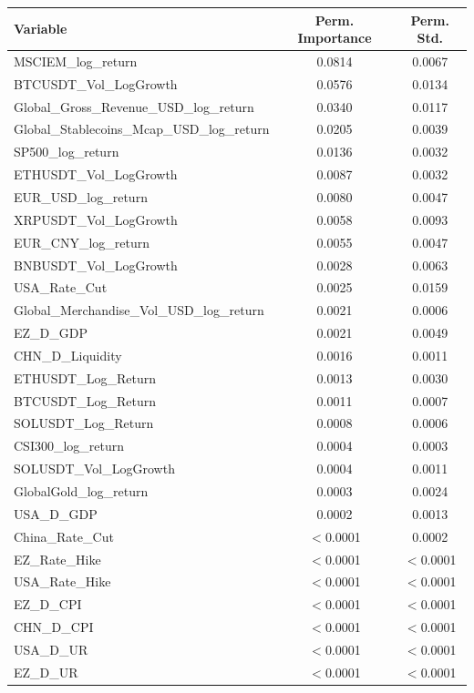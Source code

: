 \begin{tabular}{lcc}
  \toprule
  \textbf{Variable} & \textbf{Perm. Importance} & \textbf{Perm. Std.} \\ 
  \midrule
  MSCIEM\_log\_return & 0.0814 & 0.0067 \\ 
  BTCUSDT\_Vol\_LogGrowth & 0.0576 & 0.0134 \\ 
  Global\_Gross\_Revenue\_USD\_log\_return & 0.0340 & 0.0117 \\ 
  Global\_Stablecoins\_Mcap\_USD\_log\_return & 0.0205 & 0.0039 \\ 
  SP500\_log\_return & 0.0136 & 0.0032 \\ 
  ETHUSDT\_Vol\_LogGrowth & 0.0087 & 0.0032 \\ 
  EUR\_USD\_log\_return & 0.0080 & 0.0047 \\ 
  XRPUSDT\_Vol\_LogGrowth & 0.0058 & 0.0093 \\ 
  EUR\_CNY\_log\_return & 0.0055 & 0.0047 \\ 
  BNBUSDT\_Vol\_LogGrowth & 0.0028 & 0.0063 \\ 
  USA\_Rate\_Cut & 0.0025 & 0.0159 \\ 
  Global\_Merchandise\_Vol\_USD\_log\_return & 0.0021 & 0.0006 \\ 
  EZ\_D\_GDP & 0.0021 & 0.0049 \\ 
  CHN\_D\_Liquidity & 0.0016 & 0.0011 \\ 
  ETHUSDT\_Log\_Return & 0.0013 & 0.0030 \\ 
  BTCUSDT\_Log\_Return & 0.0011 & 0.0007 \\ 
  SOLUSDT\_Log\_Return & 0.0008 & 0.0006 \\ 
  CSI300\_log\_return & 0.0004 & 0.0003 \\ 
  SOLUSDT\_Vol\_LogGrowth & 0.0004 & 0.0011 \\ 
  GlobalGold\_log\_return & 0.0003 & 0.0024 \\ 
  USA\_D\_GDP & 0.0002 & 0.0013 \\ 
  China\_Rate\_Cut & $<$0.0001 & 0.0002 \\ 
  EZ\_Rate\_Hike & $<$0.0001 & $<$0.0001 \\ 
  USA\_Rate\_Hike & $<$0.0001 & $<$0.0001 \\ 
  EZ\_D\_CPI & $<$0.0001 & $<$0.0001 \\ 
  CHN\_D\_CPI & $<$0.0001 & $<$0.0001 \\ 
  USA\_D\_UR & $<$0.0001 & $<$0.0001 \\ 
  EZ\_D\_UR & $<$0.0001 & $<$0.0001 \\ 

\end{tabular}
